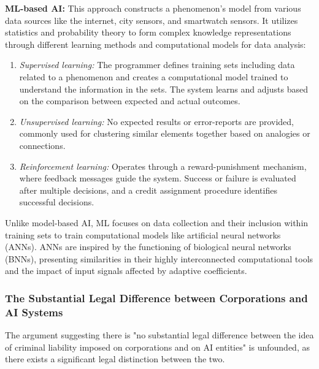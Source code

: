 \textbf{ML-based AI:} This approach constructs a phenomenon's model from various data sources like the internet, city sensors, and smartwatch sensors. It utilizes statistics and probability theory to form complex knowledge representations through different learning methods and computational models for data analysis:

\begin{enumerate}
    \item \textit{Supervised learning:} The programmer defines training sets including data related to a phenomenon and creates a computational model trained to understand the information in the sets. The system learns and adjusts based on the comparison between expected and actual outcomes.
    \item \textit{Unsupervised learning:} No expected results or error-reports are provided, commonly used for clustering similar elements together based on analogies or connections.
    \item \textit{Reinforcement learning:} Operates through a reward-punishment mechanism, where feedback messages guide the system. Success or failure is evaluated after multiple decisions, and a credit assignment procedure identifies successful decisions.
\end{enumerate}

Unlike model-based AI, ML focuses on data collection and their inclusion within training sets to train computational models like artificial neural networks (ANNs). ANNs are inspired by the functioning of biological neural networks (BNNs), presenting similarities in their highly interconnected computational tools and the impact of input signals affected by adaptive coefficients.

\subsubsection{The Substantial Legal Difference between Corporations and AI Systems}

The argument suggesting there is "no substantial legal difference between the idea of criminal liability imposed on corporations and on AI entities" is unfounded, as there exists a significant legal distinction between the two. 


